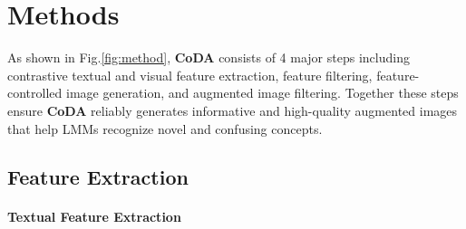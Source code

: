\section{Methods}
\label{sec:method}






As shown in Fig.\ref{fig:method}, \textbf{CoDA} consists of 4 major steps including contrastive textual and visual feature extraction, feature filtering, feature-controlled image generation, and augmented image filtering. Together these steps ensure \textbf{CoDA} reliably generates informative and high-quality augmented images that help LMMs recognize novel and confusing concepts.


\subsection{Feature Extraction}
\label{subsec:feature_extraction}


\paragraph*{Textual Feature Extraction} 


